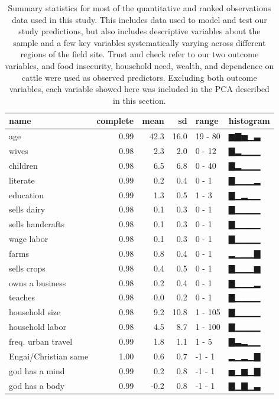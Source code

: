 \documentclass[
  11pt,
]{article}
\begin{document}
\begin{landscape}

\begin{table}
\caption{\label{tab:summary_tab}Summary statistics for most of the quantitative and ranked observations data used in this study. This includes data used to model and  test our study predictions, but also includes descriptive variables about the sample and a few key variables systematically varying across different regions of the field site. Trust and check refer to our two outcome variables, and food insecurity, household need, wealth, and dependence on cattle were used as observed predictors. Excluding both outcome variables, each variable showed here was included in the PCA described in this section.}

\centering
\fontsize{9}{11}\selectfont
\begin{tabular}{lrrrll}
\toprule
name & complete & mean & sd & range & histogram\\
\midrule
age & 0.99 & 42.3 & 16.0 & 19 - 80 & ▆▇▅▁▃\\
wives & 0.98 & 2.3 & 2.0 & 0 - 12 & ▇▂▁▁▁\\
children & 0.98 & 6.5 & 6.8 & 0 - 40 & ▇▂▁▁▁\\
literate & 0.99 & 0.2 & 0.4 & 0 - 1 & ▇▁▁▁▂\\
education & 0.99 & 1.3 & 0.5 & 1 - 3 & ▇▁▂▁▁\\
\addlinespace
sells dairy & 0.98 & 0.1 & 0.3 & 0 - 1 & ▇▁▁▁▁\\
sells handcrafts & 0.98 & 0.1 & 0.3 & 0 - 1 & ▇▁▁▁▁\\
wage labor & 0.98 & 0.1 & 0.3 & 0 - 1 & ▇▁▁▁▁\\
farms & 0.98 & 0.8 & 0.4 & 0 - 1 & ▂▁▁▁▇\\
sells crops & 0.98 & 0.4 & 0.5 & 0 - 1 & ▇▁▁▁▆\\
\addlinespace
owns a business & 0.98 & 0.2 & 0.4 & 0 - 1 & ▇▁▁▁▂\\
teaches & 0.98 & 0.0 & 0.2 & 0 - 1 & ▇▁▁▁▁\\
household size & 0.98 & 9.2 & 10.8 & 1 - 105 & ▇▁▁▁▁\\
household labor & 0.98 & 4.5 & 8.7 & 1 - 100 & ▇▁▁▁▁\\
freq. urban travel & 0.99 & 1.8 & 1.1 & 1 - 5 & ▇▃▂▁▁\\
\addlinespace
Engai/Christian same & 1.00 & 0.6 & 0.7 & -1 - 1 & ▂▁▂▁▇\\
god has a mind & 0.99 & 0.2 & 0.8 & -1 - 1 & ▅▁▆▁▇\\
god has a body & 0.99 & -0.2 & 0.8 & -1 - 1 & ▇▁▇▁▃\\

\end{tabular}
\end{table}
\end{landscape}
\end{document}
